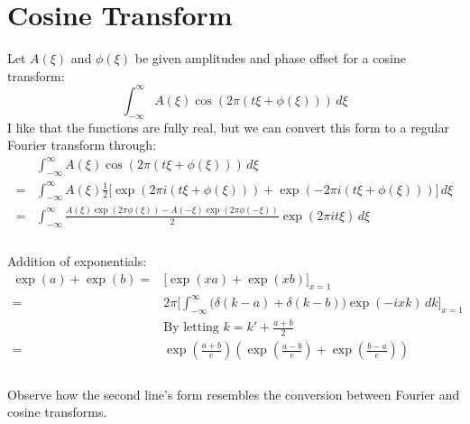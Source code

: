 
\section{Cosine Transform}
Let $A(\xi)$ and $\phi(\xi)$ be given amplitudes and phase offset for a cosine transform:
\[\int_{-\infty}^{\infty}A(\xi)\cos(2\pi(t\xi+\phi(\xi)))\,d\xi \]
I like that the functions are fully real,
but we can convert this form to a regular Fourier transform through:
\begin{equation*}
\begin{aligned}
	&\int_{-\infty}^{\infty}A(\xi)\cos(2\pi(t\xi+\phi(\xi)))\,d\xi \\
	=&\int_{-\infty}^{\infty}A(\xi)\frac{1}{2}\big[\exp(2\pi i(t\xi+\phi(\xi)))+\exp(-2\pi i(t\xi+\phi(\xi)))\big]\,d\xi \\
	=&\int_{-\infty}^{\infty}\frac{A(\xi)\exp(2\pi\phi(\xi))-A(-\xi)\exp(2\pi\phi(-\xi))}{2}\exp(2\pi i t \xi)\,d\xi \\
\end{aligned}
\end{equation*}
\\
Addition of exponentials:
\begin{equation*}
\begin{aligned}
	\exp(a)+\exp(b) =& \bigg[\exp(xa)+\exp(xb)\bigg]_{x=1} \\
	=&2\pi\bigg[\int_{-\infty}^{\infty}\big(\delta(k-a)+\delta(k-b)\big)\exp(-ixk)\,dk\bigg]_{x=1} \\
	&\text{By letting $k = k' + \frac{a+b}{2}$} \\
	=&\exp\left(\frac{a+b}{e}\right)\left(\exp\left(\frac{a-b}{e}\right)+\exp\left(\frac{b-a}{e}\right)\right)\\
\end{aligned}
\end{equation*}
\\
Observe how the second line's form resembles the conversion between Fourier and cosine transforms.
